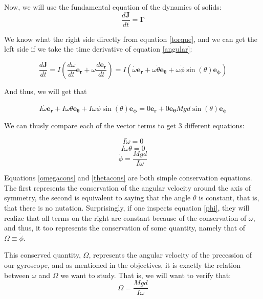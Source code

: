 \documentclass[a4paper,12pt]{article}
\begin{document}
Now, we will use the fundamental equation of the dynamics of solids:
\begin{equation}
	\label{fund}
	\frac{d \boldsymbol{J}}{dt} = \boldsymbol{\Gamma}	
\end{equation}

We know what the right side directly from equation \eqref{torque}, and we can get the left side if we take the time derivative of equation \eqref{angular}:

$$\frac{d \boldsymbol{J}}{dt} = I \left(\frac{d\omega}{dt} \boldsymbol{e_r} + \omega \frac{d\boldsymbol{e_r}}{dt}\right) = I \left(\dot{\omega} \boldsymbol{e_r} + \omega\dot{\theta} \boldsymbol{e_\theta} + \omega \dot{\phi} \sin(\theta) \boldsymbol{e_\phi}  \right)$$ 

And thus, we will get that 

\begin{equation}
	 I \dot{\omega} \boldsymbol{e_r} + I\omega\dot{\theta} \boldsymbol{e_\theta} + I\omega \dot{\phi} \sin(\theta) \boldsymbol{e_\phi} = 0 \boldsymbol{e_r} + 0 \boldsymbol{e_\theta} M g d \sin(\theta) \boldsymbol{e_{\phi}}
\end{equation}

We can thusly compare each of the vector terms to get 3 different equations:

\begin{equation}
	\label{omegacons}
	I \dot{\omega} = 0
\end{equation}
\begin{equation}
	\label{thetacons}
	I \omega \dot{\theta} = 0
\end{equation}
\begin{equation}
	\label{phi}
	\dot{\phi} = \frac{M g d}{I\omega}
\end{equation}


Equations \eqref{omegacons} and \eqref{thetacons} are both simple conservation equations. The first represents the conservation of the angular velocity around the axis of symmetry, the second is equivalent to saying that the angle $\theta$ is constant, that is, that there is no nutation. Surprisingly, if one inspects equation \eqref{phi}, they will realize that all terms on the right are constant because of the conservation of $\omega$, and thus, it too represents the conservation of some quantity, namely that of $\Omega \equiv \dot{\phi}$. 

This conserved quantity, $\Omega$, represents the angular velocity of the precession of our gyroscope, and as mentioned in the objectives, it is exactly the relation between $\omega$ and $\Omega$ we want to study. That is, we will want to verify that:
\begin{equation}
 	\Omega = \frac{M g d}{I \omega}
 \end{equation} 
\end{document}
